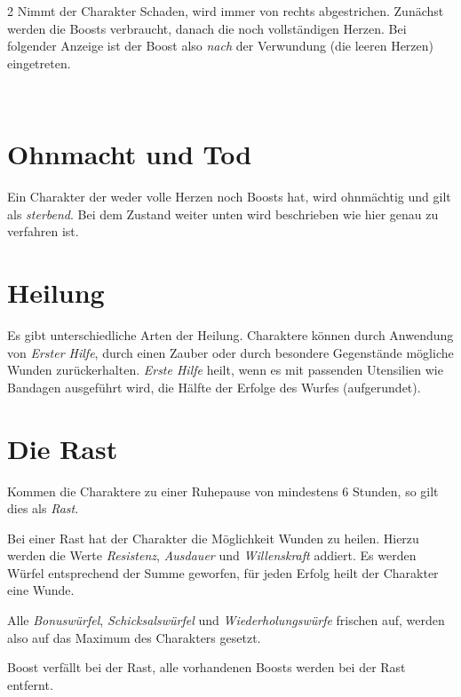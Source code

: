 \begin{multicols}{2}
Nimmt der Charakter Schaden, wird immer von rechts abgestrichen. Zunächst werden die Boosts verbraucht, danach die noch vollständigen Herzen. Bei folgender Anzeige ist der Boost also \textit{nach} der Verwundung (die leeren Herzen) eingetreten.

\textcolor{red}{\large{}~~~~~~~~~}~\textcolor{cyan}{\large{}}

\section{Ohnmacht und Tod}

Ein Charakter der weder volle Herzen noch Boosts hat, wird ohnmächtig und gilt als \textit{sterbend}. Bei dem Zustand weiter unten wird beschrieben wie hier genau zu verfahren ist.

\section{Heilung}

Es gibt unterschiedliche Arten der Heilung. Charaktere können durch Anwendung von \textit{Erster Hilfe}, durch einen Zauber oder durch besondere Gegenstände mögliche Wunden zurückerhalten. \textit{Erste Hilfe} heilt, wenn es mit passenden Utensilien wie Bandagen ausgeführt wird, die Hälfte der Erfolge des Wurfes (aufgerundet).

\section{Die Rast}

Kommen die Charaktere zu einer Ruhepause von mindestens 6 Stunden, so gilt dies als \textit{Rast}.

Bei einer Rast hat der Charakter die Möglichkeit Wunden zu heilen. Hierzu werden die Werte \textit{Resistenz}, \textit{Ausdauer} und \textit{Willenskraft} addiert. Es werden Würfel entsprechend der Summe geworfen, für jeden Erfolg heilt der Charakter eine Wunde.

Alle \textit{Bonuswürfel}, \textit{Schicksalswürfel} und \textit{Wiederholungswürfe} frischen auf, werden also auf das Maximum des Charakters gesetzt.

Boost verfällt bei der Rast, alle vorhandenen Boosts werden bei der Rast entfernt.


\end{multicols}
